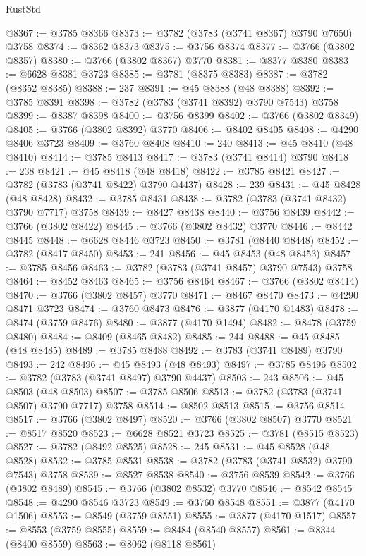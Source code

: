 \begin{lexlean}{RustStd}
\begin{coremodule}
@8367 := @3785 @8366
@8373 := @3782 (@3783 (@3741 @8367) @3790 @7650) @3758
@8374 := @8362 @8373
@8375 := @3756 @8374
@8377 := @3766 (@3802 @8357)
@8380 := @3766 (@3802 @8367) @3770
@8381 := @8377 @8380
@8383 := @6628 @8381 @3723
@8385 := @3781 (@8375 @8383)
@8387 := @3782 (@8352 @8385)
@8388 := 237
@8391 := @45 @8388 (@48 @8388)
@8392 := @3785 @8391
@8398 := @3782 (@3783 (@3741 @8392) @3790 @7543) @3758
@8399 := @8387 @8398
@8400 := @3756 @8399
@8402 := @3766 (@3802 @8349)
@8405 := @3766 (@3802 @8392) @3770
@8406 := @8402 @8405
@8408 := @4290 @8406 @3723
@8409 := @3760 @8408
@8410 := 240
@8413 := @45 @8410 (@48 @8410)
@8414 := @3785 @8413
@8417 := @3783 (@3741 @8414) @3790
@8418 := 238
@8421 := @45 @8418 (@48 @8418)
@8422 := @3785 @8421
@8427 := @3782 (@3783 (@3741 @8422) @3790 @4437)
@8428 := 239
@8431 := @45 @8428 (@48 @8428)
@8432 := @3785 @8431
@8438 := @3782 (@3783 (@3741 @8432) @3790 @7717) @3758
@8439 := @8427 @8438
@8440 := @3756 @8439
@8442 := @3766 (@3802 @8422)
@8445 := @3766 (@3802 @8432) @3770
@8446 := @8442 @8445
@8448 := @6628 @8446 @3723
@8450 := @3781 (@8440 @8448)
@8452 := @3782 (@8417 @8450)
@8453 := 241
@8456 := @45 @8453 (@48 @8453)
@8457 := @3785 @8456
@8463 := @3782 (@3783 (@3741 @8457) @3790 @7543) @3758
@8464 := @8452 @8463
@8465 := @3756 @8464
@8467 := @3766 (@3802 @8414)
@8470 := @3766 (@3802 @8457) @3770
@8471 := @8467 @8470
@8473 := @4290 @8471 @3723
@8474 := @3760 @8473
@8476 := @3877 (@4170 @1483)
@8478 := @8474 (@3759 @8476)
@8480 := @3877 (@4170 @1494)
@8482 := @8478 (@3759 @8480)
@8484 := @8409 (@8465 @8482)
@8485 := 244
@8488 := @45 @8485 (@48 @8485)
@8489 := @3785 @8488
@8492 := @3783 (@3741 @8489) @3790
@8493 := 242
@8496 := @45 @8493 (@48 @8493)
@8497 := @3785 @8496
@8502 := @3782 (@3783 (@3741 @8497) @3790 @4437)
@8503 := 243
@8506 := @45 @8503 (@48 @8503)
@8507 := @3785 @8506
@8513 := @3782 (@3783 (@3741 @8507) @3790 @7717) @3758
@8514 := @8502 @8513
@8515 := @3756 @8514
@8517 := @3766 (@3802 @8497)
@8520 := @3766 (@3802 @8507) @3770
@8521 := @8517 @8520
@8523 := @6628 @8521 @3723
@8525 := @3781 (@8515 @8523)
@8527 := @3782 (@8492 @8525)
@8528 := 245
@8531 := @45 @8528 (@48 @8528)
@8532 := @3785 @8531
@8538 := @3782 (@3783 (@3741 @8532) @3790 @7543) @3758
@8539 := @8527 @8538
@8540 := @3756 @8539
@8542 := @3766 (@3802 @8489)
@8545 := @3766 (@3802 @8532) @3770
@8546 := @8542 @8545
@8548 := @4290 @8546 @3723
@8549 := @3760 @8548
@8551 := @3877 (@4170 @1506)
@8553 := @8549 (@3759 @8551)
@8555 := @3877 (@4170 @1517)
@8557 := @8553 (@3759 @8555)
@8559 := @8484 (@8540 @8557)
@8561 := @8344 (@8400 @8559)
@8563 := @8062 (@8118 @8561)

\end{coremodule}
\end{lexlean}
